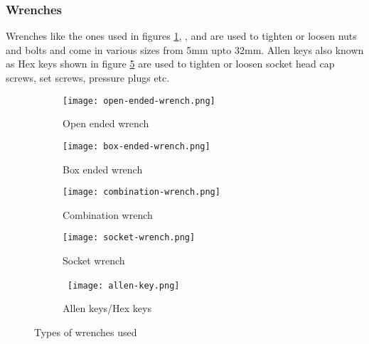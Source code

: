 \documentclass[a4paper,12pt]{article}
\begin{document}
				\subsubsection*{Wrenches}
				Wrenches like the ones used in figures \ref{subfig:open-ended-wrench}, ,  and  are used to tighten or loosen nuts and bolts and come in various sizes from 5mm upto 32mm.
				Allen keys also known as Hex keys shown in figure \ref{subfig:allen-keys} are used to tighten or loosen socket head cap screws, set screws, pressure plugs etc.
						\begin{figure}[H]
							\begin{subfigure}{0.5\textwidth}
								\centering
								\texttt{[image: open-ended-wrench.png]}
								\caption{Open ended wrench}
								\label{subfig:open-ended-wrench}							
							\end{subfigure}
							\hfill
							\begin{subfigure}{0.5\textwidth}
								\centering
								\texttt{[image: box-ended-wrench.png]}
								\caption{Box ended wrench}
								\label{subfig:box-ended-wrench}
							\end{subfigure}	
							
							\begin{subfigure}{0.5\textwidth}
								\centering
								\texttt{[image: combination-wrench.png]}
								\caption{Combination wrench}
								\label{subfig:combination-wrench}
							\end{subfigure}	
							\hfill
							\begin{subfigure}{0.5\textwidth}
								\centering
								\texttt{[image: socket-wrench.png]}
								\caption{Socket wrench}
								\label{subfig:socket-wrench}
							\end{subfigure}
							
							\begin{center}
								\begin{subfigure}{0.5\textwidth}
								\centering
\									\texttt{[image: allen-key.png]}
									\caption{Allen keys/Hex keys}
									\label{subfig:allen-keys}
								\end{subfigure}
							\end{center}
							\caption{Types of wrenches used}
							\label{fig:types-of-wrenches}		
						\end{figure}												
				
\end{document}
